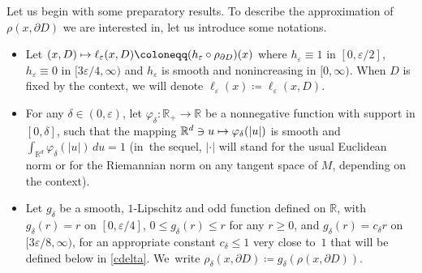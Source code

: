 \documentclass[JEP,XML,SOM,Unicode,NoFloatCountersInSection,published]{cedram}
\newcommand\mto{\mathchoice{\longmapsto}{\mapsto}{\mapsto}{\mapsto}}
\theoremstyle{plain}
\theoremstyle{definition}
\newcommand{\RR}{{\mathbb R}}
\newcommand\df{\coloneqq}
\let\d\delta
\let\e\varepsilon
\begin{document}
Let us begin with some preparatory results.
To describe the approximation of $\rho(x,\partial D)$ we are interested in, let us introduce some notations.
\begin{itemize}
\item
Let $(x,D)\mto \ell_\e(x,D)\df(h_\e\circ \rho_{\partial D})(x)$ where $h_\e\equiv 1$ in $[0,\e/2]$, $h_\e\equiv 0$ in $[3\e/4,\infty)$ and $h_\e$ is smooth and nonincreasing in $[0,\infty)$. When $D$ is fixed by the context, we will denote $\ell_\e(x)\df\ell_\e(x,D)$.
\item
For any $\d\in (0,\e)$, let $\varphi_\d:\RR_+\to \RR$ be a nonnegative function with support in $[0,\delta]$, such that
the mapping $\RR^d\ni u\mto \varphi_\d(\vert u\vert)$ is smooth and $\int_{\RR^d} \varphi_\d(\vert u\vert)\, du=1$ (in~the sequel, $\vert \cdot\vert$ will stand for the usual Euclidean norm or for the Riemannian norm on any tangent space of $M$, depending on the context).
\item
Let $g_\d$ be a smooth, $1$-Lipschitz and odd function defined on $\RR$, with $g_\d(r)=r$ on $[0,\e/4]$, $0\leq g_\d(r)\leq r$ for any $r\geq 0$, and $g_\d(r)=c_\delta r$ on $[3\e/8,\infty)$, for an appropriate constant $c_\delta\leq 1$ very close to~$1$ that will be defined below in \eqref{cdelta}. We~write $\rho_\d(x,\partial D)\df g_\d(\rho(x,\partial D))$.
\end{itemize}
\end{document}
